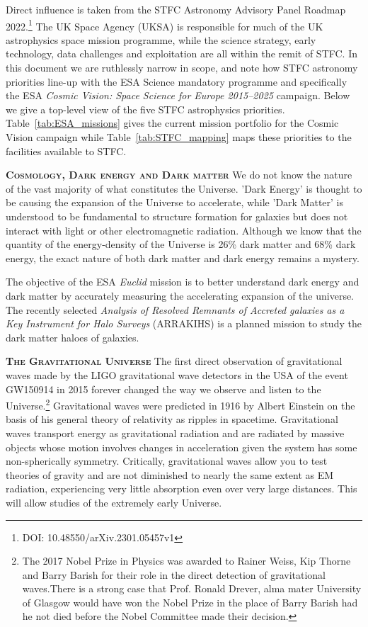 \documentclass[a4paper,12pt]{article}
\begin{document}
\smallskip
\smallskip
Direct influence is taken from the STFC Astronomy Advisory Panel
Roadmap 2022.\footnote{DOI: 10.48550/arXiv.2301.05457v1} The UK Space
Agency (UKSA) is responsible for much of the UK astrophysics space
mission programme, while the science strategy, early technology, data
challenges and exploitation are all within the remit of STFC.  In this
document we are ruthlessly narrow in scope, and note how STFC
astronomy priorities line-up with the ESA Science mandatory programme
and specifically the ESA \textit{Cosmic Vision: Space Science for
Europe 2015–2025} campaign.  Below we give a top-level view of the
five STFC astrophysics priorities.  Table~\ref{tab:ESA_missions} gives
the current mission portfolio for the Cosmic Vision campaign while
Table~\ref{tab:STFC_mapping} maps these priorities to the facilities
available to STFC.


\smallskip
\smallskip
{\bfseries \textsc{\textcolor{Cerulean}{Cosmology, Dark energy and Dark matter}}}
We do not know the nature of the vast majority of what constitutes the
Universe. 'Dark Energy' is thought to be causing the expansion of the
Universe to accelerate, while 'Dark Matter' is understood to be
fundamental to structure formation for galaxies but does not interact
with light or other electromagnetic radiation.  Although we know that
the quantity of the energy-density of the Universe is 26\% dark matter
and 68\% dark energy, the exact nature of both dark matter and dark
energy remains a mystery.

\smallskip
The objective of the ESA \textit{Euclid} mission is to better
understand dark energy and dark matter by accurately measuring the
accelerating expansion of the universe.  The recently selected
\textit{Analysis of Resolved Remnants of Accreted galaxies as a Key
Instrument for Halo Surveys} (ARRAKIHS) is a planned mission to study
the dark matter haloes of galaxies.




\smallskip
\smallskip
\noindent
{\bfseries \textsc{\textcolor{Cerulean}{The Gravitational Universe}}}
The first direct observation of gravitational waves made by the LIGO
gravitational wave detectors in the USA of the event GW150914 in 2015
forever changed the way we observe and listen to the
Universe.\footnote{The 2017 Nobel Prize in Physics was awarded to
Rainer Weiss, Kip Thorne and Barry Barish for their role in the direct
detection of gravitational waves.There is a strong case that
Prof. Ronald Drever, alma mater University of Glasgow would have won
the Nobel Prize in the place of Barry Barish had he not died before
the Nobel Committee made their decision.}  Gravitational waves were
predicted in 1916 by Albert Einstein on the basis of his general
theory of relativity as ripples in spacetime.  Gravitational waves
transport energy as gravitational radiation and are radiated by
massive objects whose motion involves changes in acceleration given
the system has some non-spherically symmetry.  Critically,
gravitational waves allow you to test theories of gravity and are not
diminished to nearly the same extent as EM radiation, experiencing
very little absorption even over very large distances. This will allow
studies of the extremely early Universe.
\end{document}
